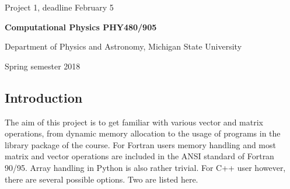 \documentclass[%
oneside,                 %
final,                   %
10pt]{article}
\begin{document}

\newcommand{\exercisesection}[1]{\subsection*{#1}}






\thispagestyle{empty}

\begin{center}
{\LARGE\bf
\begin{spacing}{1.25}
Project 1, deadline  February 5
\end{spacing}
}
\end{center}


\begin{center}
{\bf Computational Physics PHY480/905}
\end{center}

    \begin{center}
\centerline{{\small Department of Physics and Astronomy, Michigan State University}}
\end{center}
    

\begin{center}
Spring semester 2018
\end{center}

\vspace{1cm}


\subsection*{Introduction}
The aim of this project is to get familiar with various vector and matrix operations,
from dynamic memory allocation to the usage of programs in the library
package of the course. 
For Fortran users memory handling and most matrix and vector operations
are included in the ANSI standard of Fortran 90/95. Array handling in Python is also rather trivial. For C++ user however,
there are several possible options. Two are listed here.
\end{document}
